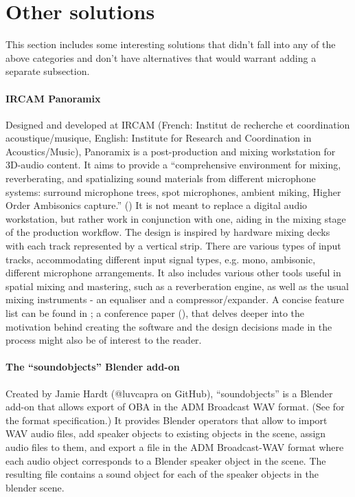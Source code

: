 \section{Other solutions}

This section includes some interesting solutions that didn't fall into any of the above categories 
and don't have alternatives that would warrant adding a separate subsection. 

\paragraph*{IRCAM Panoramix}
Designed and developed at IRCAM
(French: Institut de recherche et coordination acoustique/musique, English: Institute for Research and Coordination in Acoustics/Music), 
Panoramix is a post-production and mixing workstation for 3D-audio content. 
It aims to provide a 
``comprehensive environment for mixing, reverberating, and spatializing sound materials from different microphone systems:
surround microphone trees, spot microphones, ambient miking, Higher Order Ambisonics capture.''
(\cite{panoramix_conference_paper})
It is not meant to replace a digital audio workstation, but rather work in conjunction with one, 
aiding in the mixing stage of the production workflow. 
The design is inspired by hardware mixing decks with each track represented by a vertical strip. 
There are various types of input tracks, accommodating different input signal types, e.g. mono, ambisonic, different microphone arrangements.
It also includes various other tools useful in spatial mixing and mastering, such as a reverberation engine, 
as well as the usual mixing instruments - an equaliser and a compressor/expander. 
A concise feature list can be found in \cite{panoramix_ircam_website}; a conference paper (\cite{panoramix_conference_paper}),
that delves deeper into the motivation behind creating the software
and the design decisions made in the process might also be of interest to the reader.

\paragraph*{The ``soundobjects'' Blender add-on}
Created by Jamie Hardt (@luvcapra on GitHub), ``soundobjects'' is a Blender add-on
that allows export of OBA in the ADM Broadcast WAV format. (See \cite{dolby_adm_spec} for the format specification.)
It provides Blender operators that allow to import WAV audio files, add speaker objects to existing objects in the scene, assign audio files to them, 
and export a file in the ADM Broadcast-WAV format where each audio object corresponds to a Blender speaker object in the scene.
The resulting file contains a sound object for each of the speaker objects in the blender scene.

